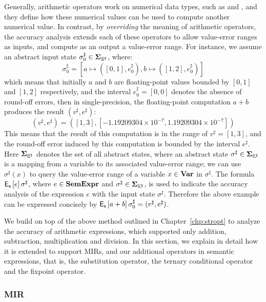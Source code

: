 Generally, arithmetic operators work on numerical data types, such as
\inttype{} and \floattype, and they define how these numerical values can be
used to compute another numerical value.  In contrast, by \emph{overriding}
the meaning of arithmetic operators, the accuracy analysis extends each of
these operators to allow value-error ranges as inputs, and compute as an
output a value-error range.  For instance, we assume an abstract input state
$\sigma^\sharp_0 \in \mathbf{\Sigma}_{\mathbb{E}^\sharp}$, where:
\begin{equation}
        \sigma^\sharp_0 = \left[
            a \mapsto ([0, 1], e^\sharp_0),
            b \mapsto ([1, 2], e^\sharp_0) \right]
\end{equation}
which means that initially
$a$ and $b$ are floating-point values bounded by $[0, 1]$ and $[1, 2]$
respectively, and the interval $e^\sharp_0 = [0, 0]$ denotes the absence of
round-off errors, then in single-precision, the floating-point computation $a
+ b$ produces the result $\left( v^\sharp, e^\sharp \right)$:
\begin{equation}
    \left( v^\sharp, e^\sharp \right) = \left(
        [1, 3], [-1.19209304 \times 10^{-7}, 1.19209304 \times 10^{-7}]
    \right)
\end{equation}
This means that the result of this computation is in the range of $v^\sharp =
[1, 3]$, and the round-off error induced by this computation is bounded by the
interval $e^\sharp$.  Here $\mathbf{\Sigma}_{\mathbb{E}^\sharp}$ denotes the set of all abstract states,
where an abstract state $\sigma^\sharp \in \mathbf{\Sigma}_{\mathbb{E}^\sharp}$ is a mapping from a
variable to its associated value-error range; we can use $\sigma^\sharp(x)$ to
query the value-error range of a variable $x \in \mathbf{Var}$ in $\sigma^\sharp$.
The formula $\operatorname{\mathsf{E}_\mathsf{s}}\left[{e}\right]{\sigma^\sharp}$, where $e \in \mathbf{SemExpr}$ and
$\sigma^\sharp \in \mathbf{\Sigma}_{\mathbb{E}^\sharp}$, is used to indicate the accuracy analysis of
the expression $e$ with the input state $\sigma^\sharp$.  Therefore the above
example can be expressed concisely by $\operatorname{\mathsf{E}_\mathsf{s}}\left[{a + b}\right]{\sigma^\sharp_0} =
(v^\sharp, e^\sharp)$.

We build on top of the above method outlined in Chapter~\ref{chp:stropt} to
analyze the accuracy of arithmetic expressions, which supported only addition,
subtraction, multiplication and division.  In this section, we explain in
detail how it is extended to support MIRs, and our additional operators
in semantic expressions, that is, the substitution operator, the ternary
conditional operator and the fixpoint operator.

\subsubsection{MIR}

